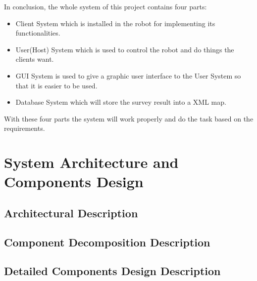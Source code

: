 \documentclass[11pt, a4paper]{report}
\begin{document}
In conclusion, the whole system of this project contains four parts:
\begin{itemize}
  \item Client System which is installed in the robot for implementing its functionalities.
  \item User(Host) System which is used to control the robot and do things the clients want.
  \item GUI System is used to give a graphic user interface to the User System so that it is easier to be used.
  \item Database System which will store the survey result into a XML map.
\end{itemize}
With these four parts the system will work properly and do the task based on the requirements.



\pagebreak


\chapter{System Architecture and Components Design}%
\label{cha:SACD}


\section{Architectural Description}

\section{Component Decomposition Description}


\section{Detailed Components Design Description}
\end{document}
